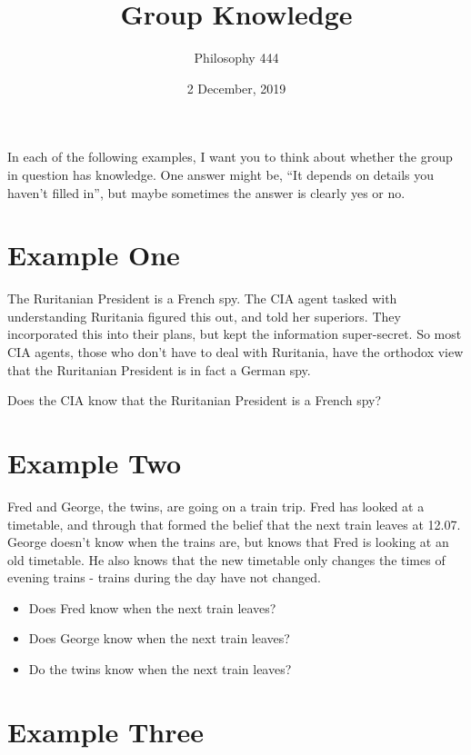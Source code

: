 \documentclass[11pt,]{article}
\title{Group Knowledge}
\author{Philosophy 444}
\date{2 December, 2019}
\providecommand{\tightlist}{%
  \setlength{\itemsep}{0pt}\setlength{\parskip}{0pt}}
\begin{document}
\maketitle

In each of the following examples, I want you to think about whether the
group in question has knowledge. One answer might be, ``It depends on
details you haven't filled in'', but maybe sometimes the answer is
clearly yes or no.

\hypertarget{example-one}{%
\section{Example One}\label{example-one}}

The Ruritanian President is a French spy. The CIA agent tasked with
understanding Ruritania figured this out, and told her superiors. They
incorporated this into their plans, but kept the information
super-secret. So most CIA agents, those who don't have to deal with
Ruritania, have the orthodox view that the Ruritanian President is in
fact a German spy.

Does the CIA know that the Ruritanian President is a French spy?

\hypertarget{example-two}{%
\section{Example Two}\label{example-two}}

Fred and George, the twins, are going on a train trip. Fred has looked
at a timetable, and through that formed the belief that the next train
leaves at 12.07. George doesn't know when the trains are, but knows that
Fred is looking at an old timetable. He also knows that the new
timetable only changes the times of evening trains - trains during the
day have not changed.

\begin{itemize}
\tightlist
\item
  Does Fred know when the next train leaves?
\item
  Does George know when the next train leaves?
\item
  Do the twins know when the next train leaves?
\end{itemize}

\hypertarget{example-three}{%
\section{Example Three}\label{example-three}}
\end{document}

